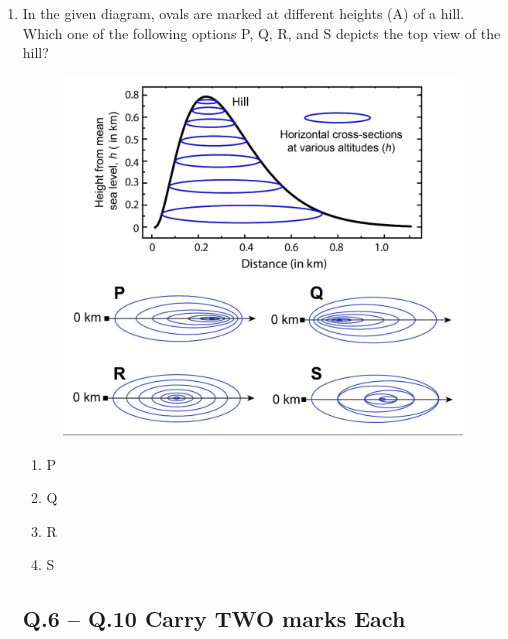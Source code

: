 \documentclass[journal,12pt,onecolumn]{IEEEtran}
\begin{document}
\begin{enumerate}
    \item In the given diagram, ovals are marked at different heights (A) of a hill. Which one of the following options P, Q, R, and S depicts the top view of the hill?
	    \begin{figure}[H]
		\centering
	\includegraphics[scale=0.3]{5}
		    \caption*{}
		\label{fig:Q5}
	\end{figure}
    \begin{enumerate}
        \item P
        \item Q
        \item R
        \item S
    \end{enumerate}

\subsection*{Q.6 -- Q.10 Carry TWO marks Each}


\end{enumerate}
\end{document}
